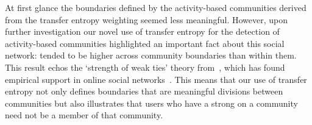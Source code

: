 

At first glance the boundaries defined by the activity-based communities derived from the transfer entropy weighting seemed less meaningful. However, upon further investigation our novel use of transfer entropy for the detection of activity-based communities highlighted an important fact about this social network: \DIFdelbegin {}\DIFdelend \DIFaddbegin {}\DIFaddend tended to be higher across community boundaries than within them. This result echos the `strength of weak ties' theory from~\cite{granovetter1973strength}, which has found empirical support in online social networks~\cite{grabowicz2012social}. This means that our use of transfer entropy not only defines boundaries that are meaningful divisions between communities but also illustrates that users who have a strong \DIFdelbegin {}\DIFdelend \DIFaddbegin {}\DIFaddend on a community need not be a member of that community. 



